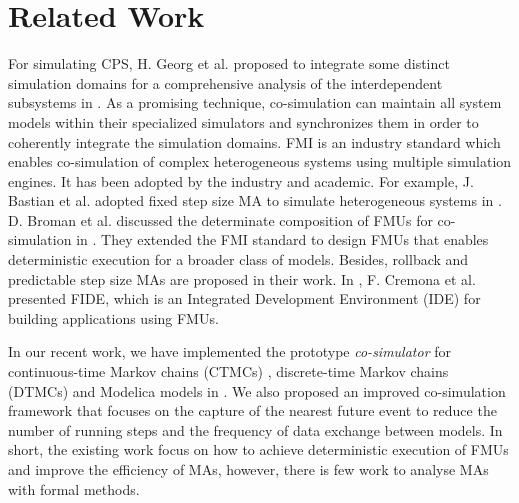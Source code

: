 \section{Related Work}
\label{sec:relateworks}
For simulating CPS, H. Georg et al. proposed to integrate some distinct simulation domains for a comprehensive analysis of the interdependent subsystems in \cite{GeorgMRW14}. As a promising technique, co-simulation \cite{Bogomolov2015Co} can maintain all system models within their specialized simulators and synchronizes them in order to coherently integrate the simulation domains. FMI \cite{Blochwitz2011The}\cite{FMI2INTRO} is an industry standard which enables co-simulation of complex heterogeneous systems using multiple simulation engines. It has been adopted by the industry and academic. For example, J. Bastian et al. adopted fixed step size MA to simulate heterogeneous systems in \cite{Bastian2011Master}.
D. Broman et al. discussed the determinate composition of FMUs for co-simulation in \cite{BromanBGLMTW13}. They extended the FMI standard to design FMUs that enables deterministic execution for a broader class of models. Besides, rollback and predictable step size MAs are proposed in their work. In \cite{CremonaLTBL16}, F. Cremona et al. presented FIDE, which is an Integrated Development Environment (IDE) for building applications using FMUs. 

In our recent work, we have implemented the prototype \textit{co-simulator} for continuous-time Markov chains (CTMCs) \cite{DanosHGS17}, discrete-time Markov chains (DTMCs) \cite{Guerry13} and Modelica models in \cite{LiuJWCD16}. We also proposed an improved co-simulation framework that focuses on the capture of the nearest future event to reduce the number of running steps and the frequency of data exchange between models. In short, the existing work focus on how to achieve deterministic execution of FMUs and improve the efficiency of MAs, however, there is few work to analyse MAs with formal methods.

